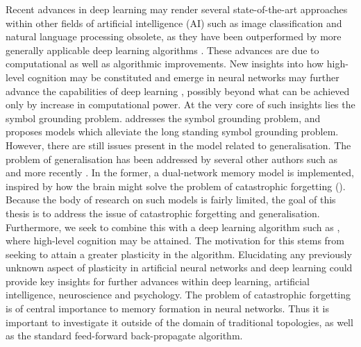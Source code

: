 Recent advances in deep learning may render several state-of-the-art approaches within other fields of artificial intelligence (AI) such as image classification and natural language processing obsolete, as they have been outperformed by more generally applicable deep learning algorithms \cite{LeCun2015, Schmidhuber2014}.  These advances are due to computational as well as algorithmic improvements. New insights into how high-level cognition may be constituted and emerge in neural networks may further advance the capabilities of deep learning \cite{Tani2014}, possibly beyond what can be achieved only by increase in computational power. At the very core of such insights lies the symbol grounding problem. \cite{Tani2014} addresses the symbol grounding problem, and proposes models which alleviate the long standing symbol grounding problem. However, there are still issues present in the model related to generalisation. The problem of generalisation has been addressed by several other authors such as \cite{McClelland1995} and more recently \cite{Hattori2014}. In the former, a dual-network memory model is implemented, inspired by how the brain might solve the problem of catastrophic forgetting (\cite{McCloskey1989, French1992}). Because the body of research on such models is fairly limited, the goal of this thesis is to address the issue of catastrophic forgetting and generalisation. Furthermore, we seek to combine this with a deep learning algorithm such as \cite{Tani2014}, where high-level cognition may be attained. The motivation for this stems from seeking to attain a greater plasticity in the algorithm. Elucidating any previously unknown aspect of plasticity in artificial neural networks and deep learning could provide key insights for further advances within deep learning, artificial intelligence, neuroscience and psychology. The problem of catastrophic forgetting is of central importance to memory formation in neural networks. Thus it is important to investigate it outside of the domain of traditional topologies, as well as the standard feed-forward back-propagate algorithm.


\clearpage